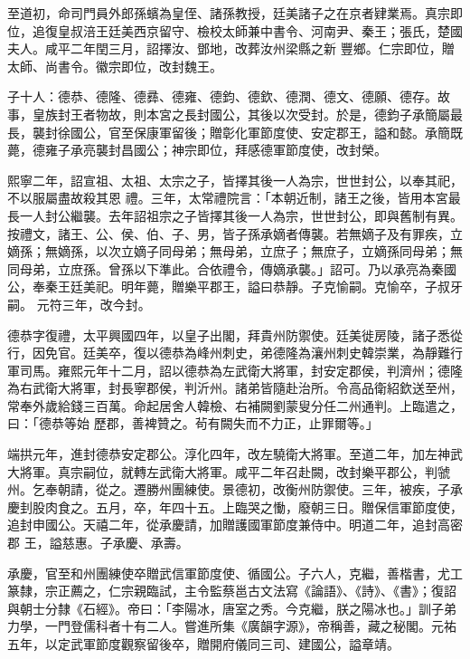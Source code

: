 \begin{pinyinscope}
 至道初，命司門員外郎孫蠙為皇侄、諸孫教授，廷美諸子之在京者肄業焉。真宗即位，追復皇叔涪王廷美西京留守、檢校太師兼中書令、河南尹、秦王；張氏，楚國夫人。咸平二年閏三月，詔擇汝、鄧地，改葬汝州梁縣之新
 豐鄉。仁宗即位，贈太師、尚書令。徽宗即位，改封魏王。



 子十人：德恭、德隆、德彞、德雍、德鈞、德欽、德潤、德文、德願、德存。故事，皇族封王者物故，則本宮之長封國公，其後以次受封。於是，德鈞子承簡屬最長，襲封徐國公，官至保康軍留後；贈彰化軍節度使、安定郡王，謚和懿。承簡既薨，德雍子承亮襲封昌國公；神宗即位，拜感德軍節度使，改封榮。



 熙寧二年，詔宣祖、太祖、太宗之子，皆擇其後一人為宗，世世封公，以奉其祀，不以服屬盡故殺其恩
 禮。三年，太常禮院言：「本朝近制，諸王之後，皆用本宮最長一人封公繼襲。去年詔祖宗之子皆擇其後一人為宗，世世封公，即與舊制有異。按禮文，諸王、公、侯、伯、子、男，皆子孫承嫡者傳襲。若無嫡子及有罪疾，立嫡孫；無嫡孫，以次立嫡子同母弟；無母弟，立庶子；無庶子，立嫡孫同母弟；無同母弟，立庶孫。曾孫以下準此。合依禮令，傳嫡承襲。」詔可。乃以承亮為秦國公，奉秦王廷美祀。明年薨，贈樂平郡王，謚曰恭靜。子克愉嗣。克愉卒，子叔牙嗣。
 元符三年，改今封。



 德恭字復禮，太平興國四年，以皇子出閣，拜貴州防禦使。廷美徙房陵，諸子悉從行，因免官。廷美卒，復以德恭為峰州刺史，弟德隆為瀼州刺史韓崇業，為靜難行軍司馬。雍熙元年十二月，詔以德恭為左武衛大將軍，封安定郡侯，判濟州；德隆為右武衛大將軍，封長寧郡侯，判沂州。諸弟皆隨赴治所。令高品衛紹欽送至州，常奉外歲給錢三百萬。命起居舍人韓檢、右補闕劉蒙叟分任二州通判。上臨遣之，曰：「德恭等始
 歷郡，善裨贊之。茍有闕失而不力正，止罪爾等。」



 端拱元年，進封德恭安定郡公。淳化四年，改左驍衛大將軍。至道二年，加左神武大將軍。真宗嗣位，就轉左武衛大將軍。咸平二年召赴闕，改封樂平郡公，判虢州。乞奉朝請，從之。遷勝州團練使。景德初，改衡州防禦使。三年，被疾，子承慶刲股肉食之。五月，卒，年四十五。上臨哭之慟，廢朝三日。贈保信軍節度使，追封申國公。天禧二年，從承慶請，加贈護國軍節度兼侍中。明道二年，追封高密郡
 王，謚慈惠。子承慶、承壽。



 承慶，官至和州團練使卒贈武信軍節度使、循國公。子六人，克繼，善楷書，尤工篆隸，宗正薦之，仁宗親臨試，主令監蔡邕古文法寫《論語》、《詩》、《書》；復詔與朝士分隸《石經》。帝曰：「李陽冰，唐室之秀。今克繼，朕之陽冰也。」訓子弟力學，一門登儒科者十有二人。嘗進所集《廣韻字源》，帝稱善，藏之秘閣。元祐五年，以定武軍節度觀察留後卒，贈開府儀同三司、建國公，謚章靖。




\end{pinyinscope}
